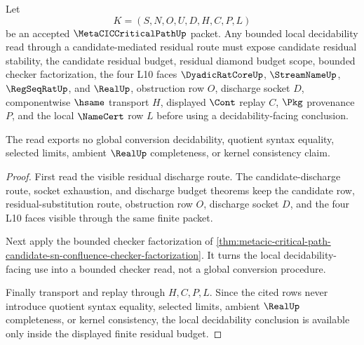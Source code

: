\begin{theorem}
\label{thm:metacic-critical-path-visible-residual-local-decidability-budget}
Let
$$
K=(S,N,O,U,D,H,C,P,L)
$$
be an accepted $\MetaCICCriticalPathUp$ packet. Any bounded local decidability read through a candidate-mediated residual route must expose candidate residual stability, the candidate residual budget, residual diamond budget scope, bounded checker factorization, the four L10 faces $\DyadicRatCoreUp$, $\StreamNameUp$, $\RegSeqRatUp$, and $\RealUp$, obstruction row $O$, discharge socket $D$, componentwise $\hsame$ transport $H$, displayed $\Cont$ replay $C$, $\Pkg$ provenance $P$, and the local $\NameCert$ row $L$ before using a decidability-facing conclusion.

The read exports no global conversion decidability, quotient syntax equality, selected limits, ambient $\RealUp$ completeness, or kernel consistency claim.
\end{theorem}
\begin{proof}
First read the visible residual discharge route. The candidate-discharge route, socket exhaustion, and discharge budget theorems keep the candidate row, residual-substitution route, obstruction row $O$, discharge socket $D$, and the four L10 faces visible through the same finite packet.

Next apply the bounded checker factorization of \autoref{thm:metacic-critical-path-candidate-sn-confluence-checker-factorization}. It turns the local decidability-facing use into a bounded checker read, not a global conversion procedure.

Finally transport and replay through $H,C,P,L$. Since the cited rows never introduce quotient syntax equality, selected limits, ambient $\RealUp$ completeness, or kernel consistency, the local decidability conclusion is available only inside the displayed finite residual budget.
\end{proof}

